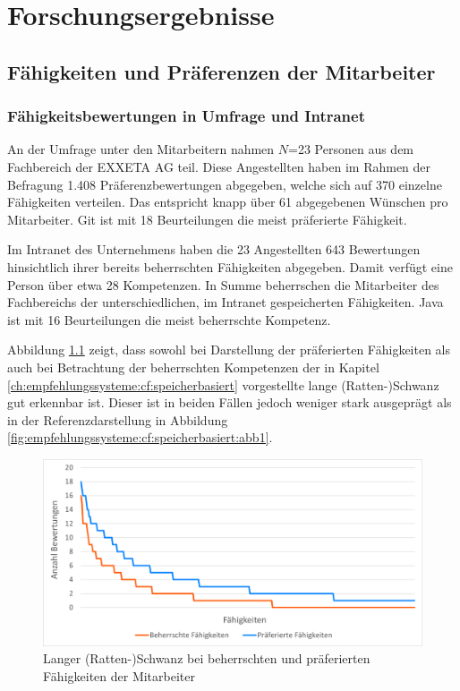 \chapter{Forschungsergebnisse}
\label{ch:ergebnisse}

\section{Fähigkeiten und Präferenzen der Mitarbeiter}
\label{ch:ergebnisse:analyse}

\subsection{Fähigkeitsbewertungen in Umfrage und Intranet}
\label{ch:ergebnisse:analyse:intranetUndUmfrage}
An der Umfrage unter den Mitarbeitern nahmen $N$=23 Personen aus dem Fachbereich \JES der EXXETA AG teil. Diese Angestellten haben im Rahmen der Befragung 1.408 Präferenzbewertungen abgegeben, welche sich auf 370 einzelne Fähigkeiten verteilen. Das entspricht knapp über 61 abgegebenen Wünschen pro Mitarbeiter. Git ist mit 18 Beurteilungen die meist präferierte Fähigkeit.

Im Intranet des Unternehmens haben die 23 Angestellten 643 Bewertungen hinsichtlich ihrer bereits beherrschten Fähigkeiten abgegeben. Damit verfügt eine Person über etwa 28 Kompetenzen. In Summe beherrschen die Mitarbeiter des Fachbereichs  der \anzFaehigkeiten unterschiedlichen, im Intranet gespeicherten Fähigkeiten. Java ist mit 16 Beurteilungen die meist beherrschte Kompetenz.

Abbildung \ref{fig:ergebnisse:analyse:abb1} zeigt, dass sowohl bei Darstellung der präferierten Fähigkeiten als auch bei Betrachtung der beherrschten Kompetenzen der in Kapitel \ref{ch:empfehlungssysteme:cf:speicherbasiert} vorgestellte lange (Ratten-)Schwanz gut erkennbar ist. Dieser ist in beiden Fällen jedoch weniger stark ausgeprägt als in der Referenzdarstellung in Abbildung \ref{fig:empfehlungssysteme:cf:speicherbasiert:abb1}.

\begin{figure}[h]
	\centering
	\includegraphics[width=1\textwidth]{gfx/long-tail-insgesamt.png}
	\caption{Langer (Ratten-)Schwanz bei beherrschten und präferierten Fähigkeiten der Mitarbeiter}
	\label{fig:ergebnisse:analyse:abb1}
\end{figure}


